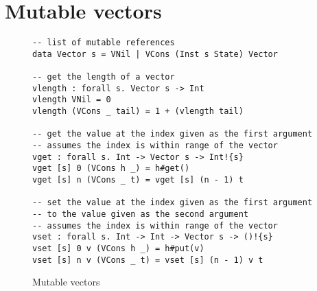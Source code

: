 \section{Mutable vectors}
\label{sec:lang-vectors}
\begin{figure}[h]
\caption{Mutable vectors}
\begin{verbatim}
-- list of mutable references
data Vector s = VNil | VCons (Inst s State) Vector

-- get the length of a vector
vlength : forall s. Vector s -> Int
vlength VNil = 0
vlength (VCons _ tail) = 1 + (vlength tail)

-- get the value at the index given as the first argument
-- assumes the index is within range of the vector
vget : forall s. Int -> Vector s -> Int!{s}
vget [s] 0 (VCons h _) = h#get()
vget [s] n (VCons _ t) = vget [s] (n - 1) t

-- set the value at the index given as the first argument
-- to the value given as the second argument
-- assumes the index is within range of the vector
vset : forall s. Int -> Int -> Vector s -> ()!{s}
vset [s] 0 v (VCons h _) = h#put(v)
vset [s] n v (VCons _ t) = vset [s] (n - 1) v t
\end{verbatim}
\label{fig:vectors}
\end{figure}


